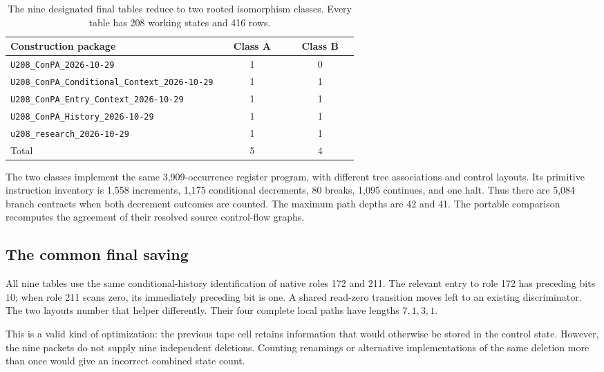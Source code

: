 \documentclass[11pt,letterpaper]{article}
\newcommand{\file}[1]{\texttt{\nolinkurl{#1}}}
\begin{document}
\begin{table}[ht]
\centering\small
\begin{tabular}{@{}p{0.61\linewidth}cc@{}}
\toprule
Construction package & Class A & Class B\\
\midrule
\file{U208_ConPA_2026-10-29} & 1 & 0\\
\file{U208_ConPA_Conditional_Context_2026-10-29} & 1 & 1\\
\file{U208_ConPA_Entry_Context_2026-10-29} & 1 & 1\\
\file{U208_ConPA_History_2026-10-29} & 1 & 1\\
\file{u208_research_2026-10-29} & 1 & 1\\
\midrule
Total & 5 & 4\\
\bottomrule
\end{tabular}
\caption{The nine designated final tables reduce to two rooted isomorphism
classes. Every table has 208 working states and 416 rows.}
\end{table}

The two classes implement the same 3,909-occurrence register program, with
different tree associations and control layouts. Its primitive instruction
inventory is 1,558 increments, 1,175 conditional decrements, 80 breaks,
1,095 continues, and one halt. Thus there are 5,084 branch contracts when
both decrement outcomes are counted. The maximum path depths are 42 and
41. The portable comparison recomputes the agreement of their resolved
source control-flow graphs.

\subsection{The common final saving}

All nine tables use the same conditional-history identification of native
roles 172 and 211. The relevant entry to role 172 has preceding bits
$10$; when role 211 scans zero, its immediately preceding bit is one.
A shared read-zero transition moves left to an existing discriminator.
The two layouts number that helper differently. Their four complete local
paths have lengths $7,1,3,1$.

This is a valid kind of optimization: the previous tape cell retains
information that would otherwise be stored in the control state. However,
the nine packets do not supply nine independent deletions. Counting
renamings or alternative implementations of the same deletion more than
once would give an incorrect combined state count.
\end{document}
